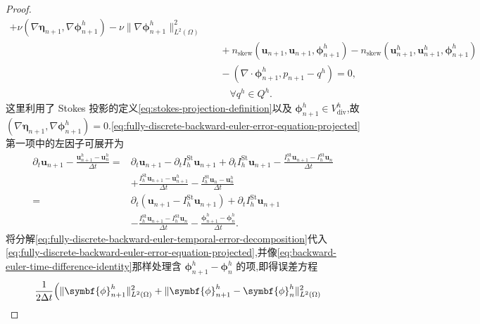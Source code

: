 \begin{proof}
\begin{equation}
\begin{aligned}
   +\nu(\nabla\symbf{\eta}_{n+1},\nabla\symbf{\phi}_{n+1}^h)
   -\nu\|\nabla\symbf{\phi}_{n+1}^h\|_{L^2(\Omega)}^2\\
 &\quad+n_{\mathrm{skew}}(\bm{u}_{n+1},\bm{u}_{n+1},
                          \symbf{\phi}_{n+1}^h)
       -n_{\mathrm{skew}}(\bm{u}_{n+1}^h,\bm{u}_{n+1}^h,
                          \symbf{\phi}_{n+1}^h)\\
  &\quad-(\nabla\cdot\symbf{\phi}_{n+1}^h,p_{n+1}-q^h)=0,\\
  &\qquad\forall q^h\in Q^h.
\end{aligned}
\end{equation}
这里利用了 Stokes 投影的定义\cref{eq:stokes-projection-definition}以及
$\symbf{\phi}_{n+1}^h\in V_{\mathrm{div}}^h$,故
$(\nabla\symbf{\eta}_{n+1},\nabla\symbf{\phi}_{n+1}^h)=0$.\cref{eq:fully-discrete-backward-euler-error-equation-projected}第一项中的左因子可展开为
\begin{equation}\label{eq:fully-discrete-backward-euler-temporal-error-decomposition}
\begin{aligned}
 \partial_t\bm{u}_{n+1}
  -\frac{\bm{u}_{n+1}^h-\bm{u}_n^h}{\Delta t}
  ={}&\partial_t\bm{u}_{n+1}
       -\partial_t I_h^{\mathrm{St}}\bm{u}_{n+1}
       +\partial_t I_h^{\mathrm{St}}\bm{u}_{n+1}
       -\frac{I_h^{\mathrm{St}}\bm{u}_{n+1}
                -I_h^{\mathrm{St}}\bm{u}_n}{\Delta t}\\
    &+\frac{I_h^{\mathrm{St}}\bm{u}_{n+1}-\bm{u}_{n+1}^h}{\Delta t}
       -\frac{I_h^{\mathrm{St}}\bm{u}_n-\bm{u}_n^h}{\Delta t}\\
   ={}&\partial_t(\bm{u}_{n+1}-I_h^{\mathrm{St}}\bm{u}_{n+1})
        +\partial_t I_h^{\mathrm{St}}\bm{u}_{n+1}\\
     &-\frac{I_h^{\mathrm{St}}\bm{u}_{n+1}
                 -I_h^{\mathrm{St}}\bm{u}_n}{\Delta t}
        -\frac{\symbf{\phi}_{n+1}^h-\symbf{\phi}_n^h}{\Delta t}.
\end{aligned}
\end{equation}
将分解\cref{eq:fully-discrete-backward-euler-temporal-error-decomposition}代入\cref{eq:fully-discrete-backward-euler-error-equation-projected},并像\cref{eq:backward-euler-time-difference-identity}那样处理含 $\symbf{\phi}_{n+1}^h-\symbf{\phi}_n^h$ 的项,即得误差方程
\begin{equation}\label{eq:fully-discrete-backward-euler-energy-error-equation}
\begin{aligned}
 &\frac1{2\Delta t}\Bigl(
      \|\symbf{\phi}_{n+1}^h\|_{L^2(\Omega)}^2
      +\|\symbf{\phi}_{n+1}^h-\symbf{\phi}_n^h\|_{L^2(\Omega)}^2

\end{aligned}
\end{equation}
\end{proof}
